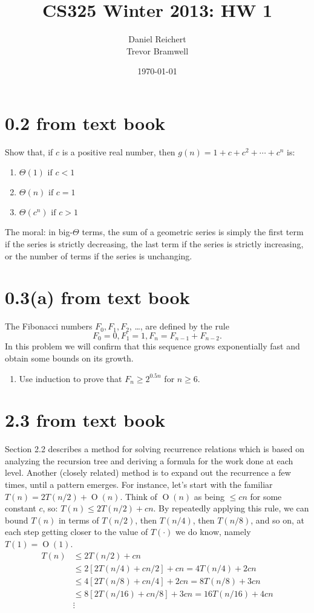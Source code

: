 \documentclass[12pt]{article}
\title{CS325 Winter 2013: HW 1}
\author{
    Daniel Reichert \\
    Trevor Bramwell
}
\date{\today}
\newcommand{\BigO}[1]{\ensuremath{\operatorname{O}\left(#1\right)}}
\begin{document}
\maketitle

\section*{0.2 from text book}
Show that, if $c$ is a positive real number, then $g(n)=1+c+c^2+\cdots+c^n$ is:

\begin{enumerate}
\item $\Theta(1) \text{ if } c < 1$
\item $\Theta(n) \text{ if } c = 1$
\item $\Theta(c^n) \text{ if } c > 1$
\end{enumerate}

The moral: in big-$\Theta$ terms, the sum of a geometric series is simply the
first term if the series is
strictly decreasing, the last term if the series is strictly increasing,
or the number of terms if the
series is unchanging.

\section*{0.3(a) from text book}

The Fibonacci numbers $F_0, F_1, F_2$, \ldots, are defined by the rule
\[ F_0 = 0, F_1 = 1, F_n = F_{n - 1} + F_{n - 2}. \]
In this problem we will confirm that this sequence grows exponentially
fast and obtain some
bounds on its growth.
\begin{enumerate}
\item Use induction to prove that $F_n \geq 2^{0.5n}$ for $n \geq 6$.
\end{enumerate}

\section*{2.3 from text book}
Section 2.2 describes a method for solving recurrence relations which is
based on analyzing the recursion tree and deriving a formula for the
work done at each level.  Another (closely related) method is to expand
out the recurrence a few times, until a pattern emerges. For instance,
let’s start with the familiar $T(n) = 2T(n/2) + \BigO{n}$. Think of
$\BigO{n}$ as being $\leq cn$ for some constant $c$,
so: $T(n) \leq 2T(n/2) + cn$. 
By repeatedly applying this rule, we can bound $T(n)$ in terms of $T(n/2)$,
then $T(n/4)$, then $T(n/8)$, and so on, at each step getting closer to
the value of $T(\cdot)$ we do know,
namely $T(1) = \BigO{1}$.
\begin{align*}
T (n) &\leq 2T (n/2) + cn \\
&\leq 2[2T(n/4) + cn/2] + cn = 4T(n/4) + 2cn \\
&\leq 4[2T(n/8) + cn/4] + 2cn = 8T(n/8) + 3cn \\
&\leq 8[2T(n/16) + cn/8] + 3cn = 16T(n/16) + 4cn \\
&  \vdots
\end{align*}
\end{document}
